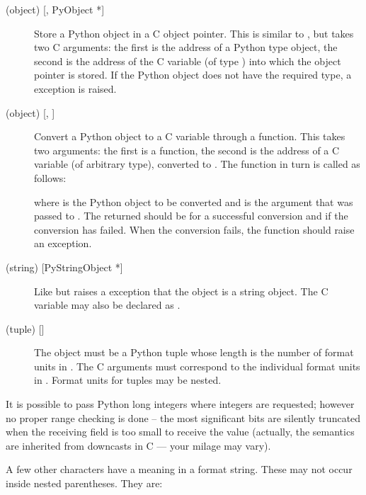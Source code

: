 \begin{description}
\item[ (object) {[, PyObject *]}]
Store a Python object in a C object pointer.  This is similar to
, but takes two C arguments: the first is the address of a
Python type object, the second is the address of the C variable (of
type ) into which the object pointer is stored.
If the Python object does not have the required type, a
 exception is raised.

\item[ (object) {[, ]}]
Convert a Python object to a C variable through a 
function.  This takes two arguments: the first is a function, the
second is the address of a C variable (of arbitrary type), converted
to .  The  function in turn is called as
follows:


where  is the Python object to be converted and
 is the  argument that was passed to
.  The returned  should be
 for a successful conversion and  if the conversion
has failed.  When the conversion fails, the  function
should raise an exception.

\item[ (string) {[PyStringObject *]}]
Like  but raises a  exception that the object
is a string object.  The C variable may also be declared as
.

\item[ (tuple) {[]}]
The object must be a Python tuple whose length is the number of format
units in .  The C arguments must correspond to the
individual format units in .  Format units for tuples may
be nested.

\end{description}

It is possible to pass Python long integers where integers are
requested; however no proper range checking is done -- the most
significant bits are silently truncated when the receiving field is
too small to receive the value (actually, the semantics are inherited
from downcasts in C --- your milage may vary).

A few other characters have a meaning in a format string.  These may
not occur inside nested parentheses.  They are:

